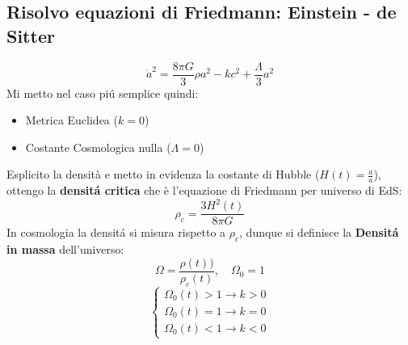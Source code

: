 \documentclass[12pt, a4paper]{article}
\begin{document}
\subsection{Risolvo equazioni di Friedmann: Einstein - de Sitter}
\begin{equation}
    \dot{a}^2 = \frac{8 \pi G}{3} \rho a^2 - kc^2 + \frac{\Lambda}{3} a^2
\end{equation}
Mi metto nel caso pi\'{u} semplice quindi:
\begin{itemize}
    \item Metrica Euclidea ($k=0$)
    \item Costante Cosmologica  nulla ($\Lambda=0$)
\end{itemize}
Esplicito la densità e metto in evidenza la costante di Hubble ($H(t)=\frac{\dot{a}}{a}$), ottengo la \textbf{densit\'{a} critica} che è l'equazione di Friedmann per universo di EdS:
\begin{equation}
   \rho_c=\frac{3 H^2(t)}{8 \pi G}
\end{equation}
In cosmologia la densit\'{a} si misura rispetto a $\rho_c$, dunque si definisce la \textbf{Densit\'{a} in massa} dell'universo:
\begin{equation}
   \Omega=\frac{\rho(t))}{\rho_c(t)},\quad \Omega_0=1
\end{equation}
\begin{equation}
  \begin{cases}
         \Omega_0(t)>1 \rightarrow k>0
         \\
         \Omega_0(t)=1 \rightarrow k=0
         \\
         \Omega_0(t)<1 \rightarrow k<0
    \end{cases}
\end{equation}
\end{document}
